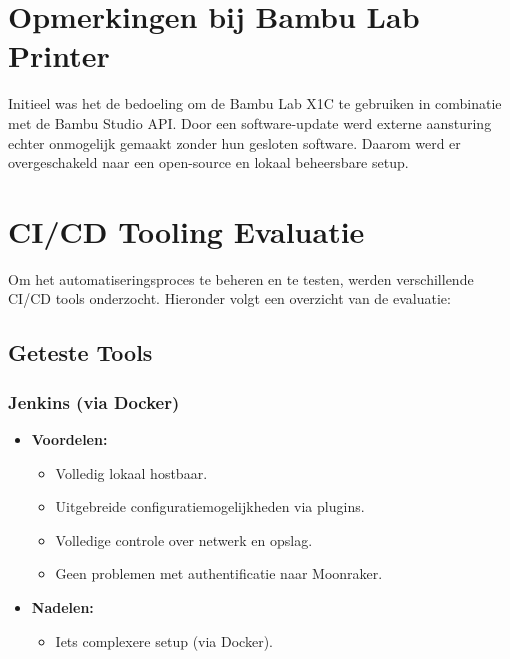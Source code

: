 \section{Opmerkingen bij Bambu Lab Printer}
Initieel was het de bedoeling om de Bambu Lab X1C te gebruiken in combinatie met de Bambu Studio API. Door een software-update werd externe aansturing echter onmogelijk gemaakt zonder hun gesloten software. Daarom werd er overgeschakeld naar een open-source en lokaal beheersbare setup.

\section{CI/CD Tooling Evaluatie}
Om het automatiseringsproces te beheren en te testen, werden verschillende CI/CD tools onderzocht. Hieronder volgt een overzicht van de evaluatie:

\subsection{Geteste Tools}

\subsubsection{Jenkins (via Docker)}
\begin{itemize}
    \item \textbf{Voordelen:}
    \begin{itemize}
        \item Volledig lokaal hostbaar.
        \item Uitgebreide configuratiemogelijkheden via plugins.
        \item Volledige controle over netwerk en opslag.
        \item Geen problemen met authentificatie naar Moonraker.
    \end{itemize}
    \item \textbf{Nadelen:}
    \begin{itemize}
        \item Iets complexere setup (via Docker).
    \end{itemize}
\end{itemize}

